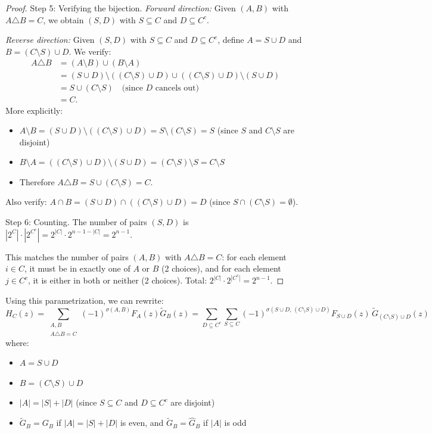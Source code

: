 \documentclass[11pt]{amsart}
\begin{document}
\begin{proof}
Step 5: Verifying the bijection.  \emph{Forward direction:} Given $(A, B)$ with $A \triangle B = C$, we obtain $(S, D)$ with $S \subseteq C$ and $D \subseteq C^c$.

\emph{Reverse direction:} Given $(S, D)$ with $S \subseteq C$ and $D \subseteq C^c$, define $A = S \cup D$ and $B = (C \setminus S) \cup D$. We verify:
\begin{align*}
A \triangle B &= (A \setminus B) \cup (B \setminus A) \\
&= (S \cup D) \setminus ((C \setminus S) \cup D) \cup ((C \setminus S) \cup D) \setminus (S \cup D) \\
&= S \cup (C \setminus S) \quad \text{(since $D$ cancels out)} \\
&= C. \quad
\end{align*}
More explicitly:
\begin{itemize}
    \item $A \setminus B = (S \cup D) \setminus ((C \setminus S) \cup D) = S \setminus (C \setminus S) = S$ (since $S$ and $C \setminus S$ are disjoint)
    \item $B \setminus A = ((C \setminus S) \cup D) \setminus (S \cup D) = (C \setminus S) \setminus S = C \setminus S$
    \item Therefore $A \triangle B = S \cup (C \setminus S) = C$.
\end{itemize}
Also verify: $A \cap B = (S \cup D) \cap ((C \setminus S) \cup D) = D$ (since $S \cap (C \setminus S) = \emptyset$).

Step 6: Counting.  The number of pairs $(S, D)$ is $|2^C| \cdot |2^{C^c}| = 2^{|C|} \cdot 2^{n-1-|C|} = 2^{n-1}$.

This matches the number of pairs $(A, B)$ with $A \triangle B = C$: for each element $i \in C$, it must be in exactly one of $A$ or $B$ (2 choices), and for each element $j \in C^c$, it is either in both or neither (2 choices). Total: $2^{|C|} \cdot 2^{|C^c|} = 2^{n-1}$.
\end{proof}

Using this parametrization, we can rewrite:
\[
H_C(z) = \sum_{\substack{A, B \\ A \triangle B = C}} (-1)^{\sigma(A,B)} F_A(z) \tilde{G}_B(z)
= \sum_{D \subseteq C^c} \sum_{S \subseteq C} (-1)^{\sigma(S \cup D, \, (C \setminus S) \cup D)} F_{S \cup D}(z) \, \tilde{G}_{(C \setminus S) \cup D}(z)
\]
where:
\begin{itemize}
    \item $A = S \cup D$
    \item $B = (C \setminus S) \cup D$
    \item $|A| = |S| + |D|$ (since $S \subseteq C$ and $D \subseteq C^c$ are disjoint)
    \item $\tilde{G}_B = G_B$ if $|A| = |S| + |D|$ is even, and $\tilde{G}_B = \hat{G}_B$ if $|A|$ is odd
\end{itemize}
\end{document}
